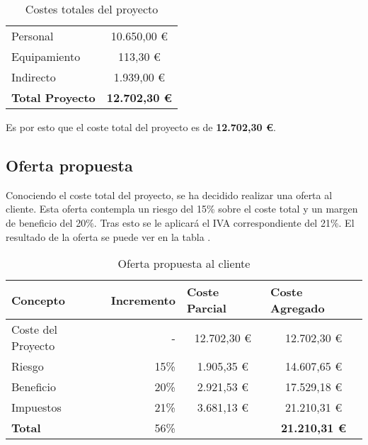 \begin{table}[htbp]
    \centering
    \caption{Costes totales del proyecto}
    \label{tab:costes_totales}
    \begin{tabular}{@{}lc@{}}
    \toprule
    Personal                & 10.650,00 \euro \\
    Equipamiento            & 113,30 \euro    \\
    Indirecto               & 1.939,00 \euro  \\ \midrule
    \textbf{Total Proyecto} & \textbf{12.702,30 \euro} \\ \bottomrule
    \end{tabular}
    \end{table}

Es por esto que el coste total del proyecto es de \textbf{12.702,30 \euro}.

\subsection{Oferta propuesta}\label{subsec:oferta_propuesta}

Conociendo el coste total del proyecto, se ha decidido realizar una oferta al cliente. Esta oferta contempla un riesgo del 15\% sobre el coste total y un margen de beneficio del 20\%. Tras esto se le aplicará el IVA correspondiente del 21\%. El resultado de la oferta se puede ver en la tabla .


\begin{table}[htbp]
    \centering
    \caption{Oferta propuesta al cliente}
    \label{tab:oferta_propuesta}
    \begin{tabular}{@{}lrcc@{}}
    \toprule
    \textbf{Concepto}  & \multicolumn{1}{l}{\textbf{Incremento}} & \multicolumn{1}{l}{\textbf{Coste Parcial}} & \multicolumn{1}{l}{\textbf{Coste Agregado}} \\ \midrule
    Coste del Proyecto & -                                       & 12.702,30 \euro                                 & 12.702,30 \euro                                  \\
    Riesgo             & 15\%                                    & 1.905,35 \euro                                  & 14.607,65 \euro                                  \\
    Beneficio          & 20\%                                    & 2.921,53 \euro                                  & 17.529,18 \euro                                  \\
    Impuestos          & 21\%                                    & 3.681,13 \euro                                  & 21.210,31 \euro                                  \\
    \textbf{Total}     & 56\%                                    &                                            & \textbf{21.210,31 \euro}                         \\ \bottomrule
    \end{tabular}
    \end{table}
